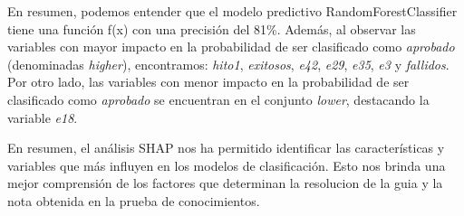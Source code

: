 En resumen, podemos entender que el modelo predictivo RandomForestClassifier tiene una función f(x) con una precisión del 81\%. Además, al observar las variables con mayor impacto en la probabilidad de ser clasificado como \textit{aprobado} (denominadas \textit{higher}), encontramos: \textit{hito1}, \textit{exitosos}, \textit{e42}, \textit{e29}, \textit{e35}, \textit{e3} y \textit{fallidos}. Por otro lado, las variables con menor impacto en la probabilidad de ser clasificado como \textit{aprobado} se encuentran en el conjunto \textit{lower}, destacando la variable \textit{e18}.

En resumen, el análisis SHAP nos ha permitido identificar las características y variables que más influyen en los modelos de clasificación. Esto nos brinda una mejor comprensión de los factores que determinan la resolucion de la guia y la nota obtenida en la prueba de conocimientos.



